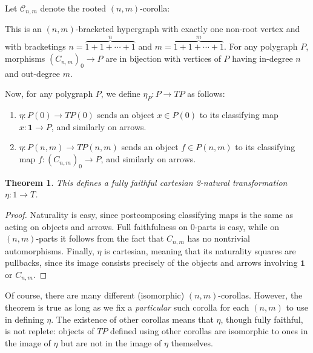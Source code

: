 \documentclass{article}
\newtheorem{thm}{Theorem}[section]
\theoremstyle{definition}
\theoremstyle{remark}
\def\C{\mathcal{C}}
\begin{document}
Let $\C_{n,m}$ denote the rooted $(n,m)$-corolla:
\begin{center}
\end{center}
This is an $(n,m)$-bracketed hypergraph with exactly one non-root vertex and with bracketings $n=\overbrace{1+1+\cdots+1}^n$ and $m=\overbrace{1+1+\cdots+1}^m$.
For any polygraph $P$, morphisms $(C_{n,m})_0 \to P$ are in bijection with vertices of $P$ having in-degree $n$ and out-degree $m$.

Now, for any polygraph $P$, we define $\eta_P : P \to T P$ as follows:
\begin{enumerate}
\item $\eta:P(0) \to TP(0)$ sends an object $x\in P(0)$ to its classifying map $x:\mathbf{1}\to P$, and similarly on arrows.
\item $\eta:P(n,m) \to TP(n,m)$ sends an object $f\in P(n,m)$ to its classifying map $f:(C_{n,m})_0\to P$, and similarly on arrows.
\end{enumerate}

\begin{thm}
  This defines a fully faithful cartesian 2-natural transformation $\eta: 1\to T$.
\end{thm}
\begin{proof}
  Naturality is easy, since postcomposing classifying maps is the same as acting on objects and arrows.
  Full faithfulness on $0$-parts is easy, while on $(n,m)$-parts it follows from the fact that $C_{n,m}$ has no nontrivial automorphisms.
  Finally, $\eta$ is cartesian, meaning that its naturality squares are pullbacks, since its image consists precisely of the objects and arrows involving $\mathbf{1}$ or $C_{n,m}$.
\end{proof}

Of course, there are many different (isomorphic) $(n,m)$-corollas.
However, the theorem is true as long as we fix a \emph{particular} such corolla for each $(n,m)$ to use in defining $\eta$.
The existence of other corollas means that $\eta$, though fully faithful, is not replete: objects of $TP$ defined using other corollas are isomorphic to ones in the image of $\eta$ but are not in the image of $\eta$ themselves.
\end{document}
